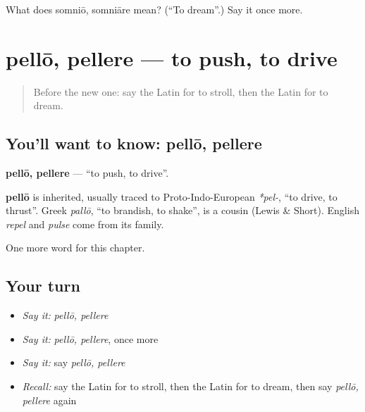 \begin{tcolorbox}[breakable,colback=teal!4,colframe=teal!35!black,title={Before you move on}]
What does somniō, somniāre mean? (\textquotedblleft{}To dream\textquotedblright{}.) Say it once more.
\end{tcolorbox}
\section[pellō, pellere]{pellō, pellere — to push, to drive}

\label{lesson:LA-C258-pello}



\begin{quote}
Before the new one: say the Latin for to stroll, then the Latin for to dream.
\end{quote}

\subsection*{You'll want to know: pellō, pellere}
\textbf{pellō, pellere} — \textquotedblleft{}to push, to drive\textquotedblright{}.

\begin{cousinweb}
\textbf{pellō} is inherited, usually traced to Proto-Indo-European \emph{*pel-}, \textquotedblleft{}to drive, to thrust\textquotedblright{}. Greek \emph{pallō}, \textquotedblleft{}to brandish, to shake\textquotedblright{}, is a cousin (Lewis \& Short). English \emph{repel} and \emph{pulse} come from its family.
\end{cousinweb}

\begin{grammarlens}[title={What you've built}]
One more word for this chapter.
\end{grammarlens}

\subsection*{Your turn}
\begin{itemize}
\raggedright
  \item \emph{Say it:} \emph{pellō, pellere}
  \item \emph{Say it:} \emph{pellō, pellere}, once more
  \item \emph{Say it:} say \emph{pellō, pellere}
  \item \emph{Recall:} say the Latin for to stroll, then the Latin for to dream, then say \emph{pellō, pellere} again
\end{itemize}

